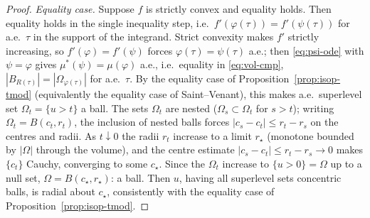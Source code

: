\documentclass[11pt]{amsart}
\theoremstyle{definition}
\newcommand{\Om}{\Omega}
\newcommand{\abs}[1]{\left|#1\right|}
\begin{document}
\begin{proof}
\emph{Equality case.} Suppose $f$ is strictly convex and equality holds.
Then equality holds in the single inequality step, i.e.\
$f'(\varphi(\tau))=f'(\psi(\tau))$ for a.e.\ $\tau$ in the support of the
integrand. Strict convexity makes $f'$ strictly increasing, so $f'(\varphi)
=f'(\psi)$ forces $\varphi(\tau)=\psi(\tau)$ a.e.; then \eqref{eq:psi-ode}
with $\psi=\varphi$ gives $\mu^*(\psi)=\mu(\varphi)$ a.e., i.e.\ equality in
\eqref{eq:vol-cmp}, $\abs{B_{R(\tau)}}=\abs{\Om_{\varphi(\tau)}}$ for a.e.\
$\tau$. By the equality case of Proposition~\ref{prop:isop-tmod} (equivalently
the equality case of Saint--Venant), this makes a.e.\ superlevel set
$\Om_t=\{u>t\}$ a ball. The sets $\Om_t$ are nested ($\Om_s\subset\Om_t$ for
$s>t$); writing $\Om_t=B(c_t,r_t)$, the inclusion of nested balls forces
$\abs{c_s-c_t}\le r_t-r_s$ on the centres and radii. As $t\downarrow0$ the
radii $r_t$ increase to a limit $r_\star$ (monotone bounded by $\abs\Om$
through the volume), and the centre estimate $\abs{c_s-c_t}\le r_t-r_s\to0$
makes $\{c_t\}$ Cauchy, converging to some $c_\star$. Since the $\Om_t$
increase to $\{u>0\}=\Om$ up to a null set, $\Om=B(c_\star,r_\star)$: a ball.
Then $u$, having all superlevel sets concentric balls, is radial about
$c_\star$, consistently with the equality case of
Proposition~\ref{prop:isop-tmod}.
\end{proof}
\end{document}
